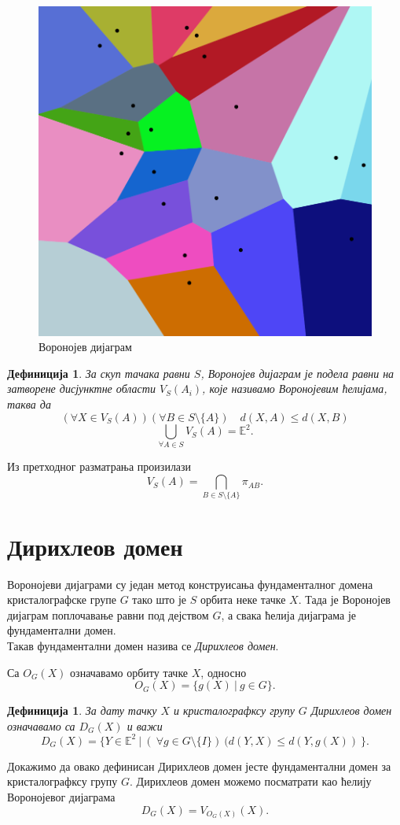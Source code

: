 \documentclass[12pt]{report}
\newtheorem{definition}[theorem]{\bf Дефиниција}
\begin{document}
\begin{figure}[H]
    \centering
    \includegraphics[width=.4\textwidth]{voronoiiii.png}
    \caption{Воронојев дијаграм}
    \label{fig:my_label}
\end{figure}

\begin{definition}%
За скуп тачака равни $S$, Воронојев дијаграм је подела равни на затворене дисјунктне области $V_S(A_i)$, које називамо Воронојевим  ћелијама, таква да
$$ (\forall X \in V_{S}(A))(\forall B \in S\setminus \{A\})\quad d(X,A)\leq d(X,B) $$
$$ \bigcup_{\forall A \in S} V_{S}(A) = \mathbb{E}^2 .$$

\end{definition}

Из претходног разматрања произилази
$$V_S(A) = \bigcap _{B \in S \setminus \{A\}} \pi_{AB}.$$ 

\section{Дирихлеов домен}

Воронојеви дијаграми су један метод конструисања фундаменталног домена кристалографске групе $G$ тако што је $S$ орбита неке тачке $X$. Тада је Воронојев дијаграм поплочавање равни под дејством $G$, а свака ћелија дијаграма је фундаментални домен. \\
Такав фундаментални домен назива се \emph{Дирихлеов домен}.

Са $O_G(X)$ означавамо орбиту тачке $X$, односно
$$O_G(X) = \{g(X)\:|\:g \in G\} .$$

\begin{definition}
За дату тачку $X$ и кристалографксу групу $G$ Дирихлеов домен означавамо са $D_G(X)$ и важи
$$D_G(X) = \{Y \in \mathbb{E}^2\:|\:(\:\forall g \in G \setminus \{I\})\:(d(Y,X)\leq d(Y,g(X))\:\}.$$
\end{definition}

\noindent  Докажимо да овако дефинисан Дирихлеов домен јесте фундаментални домен за кристалографксу групу $G$.
Дирихлеов домен можемо посматрати као ћелију Воронојевог дијаграма 
$$D_G(X)= V_{O_G(X)}(X).$$
\end{document}
